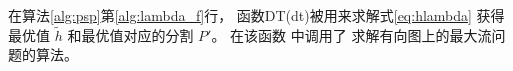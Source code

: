 在算法\ref{alg:psp}第\ref{alg:lambda_f}行，
函数DT(\glsdesc{dt})被用来求解式\eqref{eq:hlambda} 获得最优值
$\tilde{h}$ 和最优值对应的分割 $P'$。
%
在该函数
中调用了
求解有向图上的最大流问题的算法。
%
